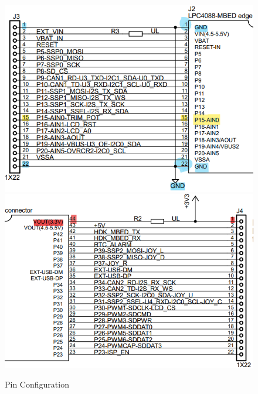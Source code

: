 \documentclass{cce2014-design}
\begin{document}
\begin{figure}[!h]
   \centering
   \includegraphics[width=0.95\linewidth]{pin_config_1.png}
   \includegraphics[width=0.95\linewidth]{pin_config_2.png}
   \caption{Pin Configuration}
   \label{fig:pinconfiguartions}
\end{figure}

\vspace{1em}
\end{document}
